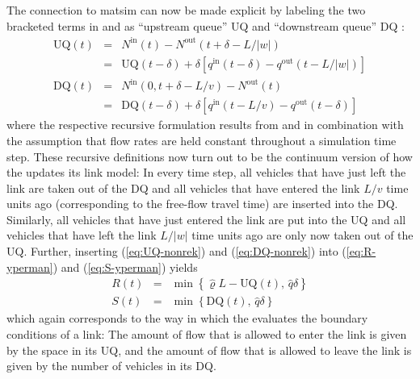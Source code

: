 The connection to \gls{matsim} can now be made explicit by labeling the
two bracketed terms in  and 
as {}``upstream queue'' UQ and {}``downstream queue'' DQ \citep{osorio-2011a,osorio-2013b}:
\begin{eqnarray}
\text{UQ}(t) & = & N^{\text{in}}(t)-N^{\text{out}}(t+\delta-L/|w|)\label{eq:UQ-nonrek}\\
 & = & \text{UQ}(t-\delta)+\delta\left[q^{\text{in}}(t-\delta)-q^{\text{out}}(t-L/|w|)\right]\label{eq:UQ-rek}\\
\text{DQ}(t) & = & N^{\text{in}}(0,t+\delta-L/v)-N^{\text{out}}(t)\label{eq:DQ-nonrek}\\
 & = & \text{DQ}(t-\delta)+\delta\left[q^{\text{in}}(t-L/v)-q^{\text{out}}(t-\delta)\right]\label{eq:DQ-rek}
\end{eqnarray}
where the respective recursive formulation results from 
and  in combination with the assumption that
flow rates are held constant throughout a simulation time step. These
recursive definitions now turn out to be the continuum version of
how the  updates its link model: In
every time step, all vehicles that have just left the link are taken
out of the DQ and all vehicles that have entered the link $L/v$ time
units ago (corresponding to the free-flow travel time) are inserted
into the DQ. Similarly, all vehicles that have just entered the link
are put into the UQ and all vehicles that have left the link $L/|w|$
time units ago are only now taken out of the UQ. Further, inserting
(\ref{eq:UQ-nonrek}) and (\ref{eq:DQ-nonrek}) into (\ref{eq:R-yperman})
and (\ref{eq:S-yperman}) yields
\begin{eqnarray}
R(t) & = & \min\left\{ \hat{\varrho}L-\text{UQ}(t),\,\hat{q}\delta\right\} \label{eq:R-matsim}\\
S(t) & = & \min\left\{ \text{DQ}(t),\,\hat{q}\delta\right\} \label{eq:S-matsim}
\end{eqnarray}
which again corresponds to the way in which the 
evaluates the boundary conditions of a link: The amount of flow that
is allowed to enter the link is given by the space in its UQ, and
the amount of flow that is allowed to leave the link is given by the
number of vehicles in its DQ. 

